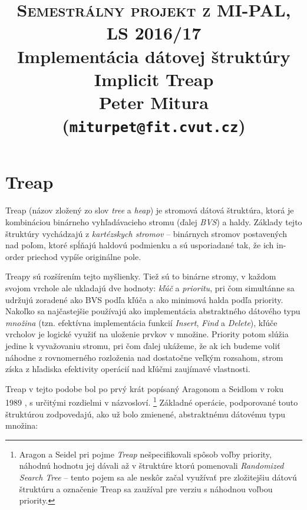 \documentclass[a4paper, 12pt]{article}
\theoremstyle{definition}
\begin{document}
\title{\textsc{\large{Semestrálny projekt z MI-PAL, LS 2016/17}}\\
\vspace{1cm}
\large{Implementácia dátovej štruktúry}\\
\Huge{Implicit Treap}\\
\vspace{1cm}
\normalsize{Peter Mitura (\texttt{miturpet@fit.cvut.cz})}}

\maketitle

\section{Treap}

Treap (názov zložený zo slov \emph{tree} a \emph{heap}) je stromová dátová
štruktúra, ktorá je kombináciou binárneho vyhľadávacieho stromu (ďalej
\emph{BVS}) a haldy.  Základy tejto štruktúry vychádzajú z \emph{kartézskych
stromov} \cite{cartesian} -- binárnych stromov postavených nad poľom, ktoré
spĺňajú haldovú podmienku a sú usporiadané tak, že ich in-order priechod vypíše
originálne pole.

Treapy sú rozšírením tejto myšlienky. Tiež sú to binárne stromy, v každom
svojom vrchole ale ukladajú dve hodnoty: \emph{kľúč} a \emph{prioritu}, pri čom
simultánne sa udržujú zoradené ako BVS podľa kľúča a ako minimová halda podľa
priority.  Nakoľko sa najčastejšie používajú ako implementácia abstraktného
dátového typu \emph{množina} (tzn. efektívna implementácia funkcií
\emph{Insert}, \emph{Find} a \emph{Delete}), kľúče vrcholov je logické využiť
na uloženie prvkov v množine. Priority potom slúžia jedine k vyvažovaniu
stromu, pri čom ďalej ukážeme, že ak ich budeme voliť náhodne z rovnomerného
rozloženia nad dostatočne veľkým rozsahom, strom získa z hľadiska efektivity
operácií nad kľúčmi zaujímavé vlastnosti.

Treap v tejto podobe bol po prvý krát popísaný Aragonom a Seidlom v roku 1989
\cite{treaps}, s určitými rozdielmi v názvosloví.
\footnote{Aragon a Seidel
pri pojme \emph{Treap} nešpecifikovali spôsob voľby priority, náhodnú hodnotu
jej dávali až v štruktúre ktorú pomenovali \emph{Randomized Search Tree} --
tento pojem sa ale neskôr začal využívať pre zložitejšiu dátovú štruktúru a
označenie Treap sa zaužíval pre verziu s náhodnou voľbou priority.}
Základné operácie, podporované touto štruktúrou zodpovedajú, ako už bolo
zmienené, abstraktnému dátovému typu množina:
\end{document}
